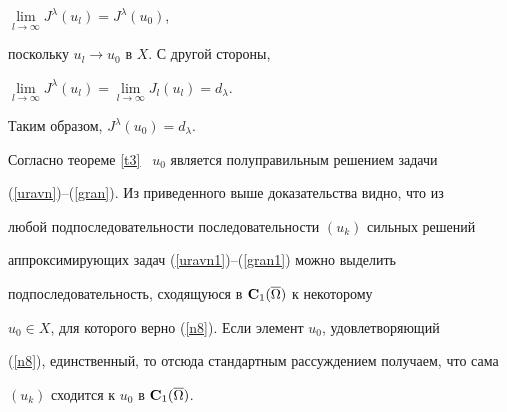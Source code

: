 \begin{pf}
$\lim\limits_{l\to\infty}J^\lambda(u_l)=J^\lambda(u_0)$,


поскольку $u_l\to u_0$ в $X$. С другой стороны,


$\lim\limits_{l\to\infty}J^\lambda(u_l)=


\lim\limits_{l\to\infty}J_l(u_l)=d_\lambda$.


Таким образом, $J^\lambda(u_0)=d_\lambda$.





Согласно теореме \ref{t3} \ $u_0$ является полуправильным решением задачи


(\ref{uravn})--(\ref{gran}). Из приведенного выше доказательства видно, что из


любой подпоследовательности последовательности $(u_k)$ сильных решений


аппроксимирующих задач (\ref{uravn1})--(\ref{gran1}) можно выделить


подпоследовательность, сходящуюся в ${\bold C}_1(\overline{\Omega})$ к некоторому


$u_0\in X$, для которого верно (\ref{n8}). Если элемент $u_0$, удовлетворяющий


(\ref{n8}), единственный, то отсюда стандартным рассуждением получаем, что сама


$(u_k)$ сходится к $u_0$ в ${\bold C}_1(\overline{\Omega})$.


\end{pf}








